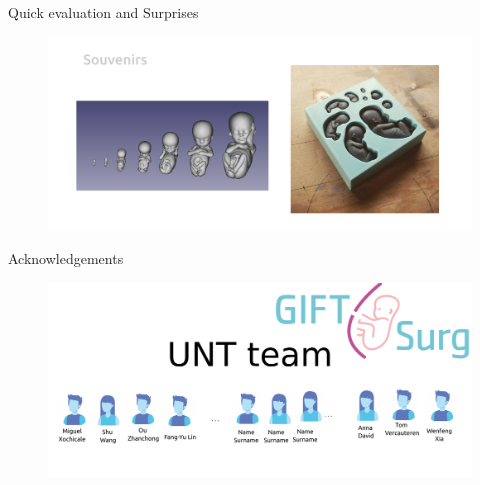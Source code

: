 {
\begin{frame}{Quick evaluation and Surprises}
  \begin{figure}
  \centering
  \includegraphics[width=1.0\textwidth]{./figures/evaluation-souvenirs/versions/drawing-v01}
  \end{figure}

\end{frame}
}



{
\begin{frame}{Acknowledgements}

  \begin{figure}
  \centering
  \includegraphics[width=1.0\textwidth]{./figures/team/versions/drawing-v02.png}
  \end{figure}

\end{frame}
}
